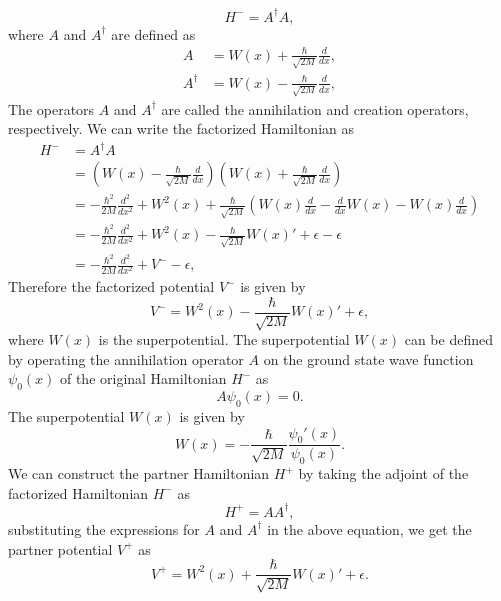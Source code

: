 \documentclass[a4paper, 12pt]{article}
\begin{document}
\begin{equation}
H^- = A^\dagger A,
\end{equation}
where \( A \) and \( A^\dagger \) are defined as
\begin{align}
A &= W(x)+\frac{\hbar}{\sqrt{2M}}\frac{d}{dx},\nonumber\\
A^\dagger &=W(x)-\frac{\hbar}{\sqrt{2M}}\frac{d}{dx},
\end{align}
The operators \( A \) and \( A^\dagger \) are called the annihilation and creation operators, respectively. We can write the factorized Hamiltonian as
\begin{align*}
H^- &= A^\dagger A\\
&= \left(W(x)-\frac{\hbar}{\sqrt{2M}}\frac{d}{dx}\right)\left(W(x)+\frac{\hbar}{\sqrt{2M}}\frac{d}{dx}\right)\\
&=-\frac{\hbar^2}{2M}\frac{d^2}{dx^2}+ W^2(x) + \frac{\hbar}{\sqrt{2M}}\left(W(x)\frac{d}{dx}-\frac{d}{dx}W(x)-W(x)\frac{d}{dx}\right) \\
&=-\frac{\hbar^2}{2M}\frac{d^2}{dx^2}+ W^2(x) - \frac{\hbar}{\sqrt{2M}}W(x)'+\epsilon-\epsilon \\
&=-\frac{\hbar^2}{2M}\frac{d^2}{dx^2} + V^- -\epsilon,
\end{align*}
Therefore the factorized potential \( V^- \) is given by
\begin{equation}
V^- = W^2(x) - \frac{\hbar}{\sqrt{2M}}W(x)'+\epsilon,
\end{equation}
where \( W(x) \) is the superpotential. The superpotential \( W(x) \) can be defined by operating the annihilation operator \( A \) on the ground state wave function \( \psi_0(x) \) of the original Hamiltonian \( H^- \) as
\begin{equation}
A\psi_0(x) = 0.
\end{equation}
The superpotential \( W(x) \) is given by
\begin{equation}
W(x) = -\frac{\hbar}{\sqrt{2M}}\frac{\psi_0'(x)}{\psi_0(x)}.
\end{equation}
We can construct the partner Hamiltonian \( H^+ \) by taking the adjoint of the factorized Hamiltonian \( H^- \) as
\begin{equation}
H^+ = A A^\dagger,
\end{equation}
substituting the expressions for \( A \) and \( A^\dagger \) in the above equation, we get the partner potential \( V^+ \) as
\begin{equation}
V^+ = W^2(x) + \frac{\hbar}{\sqrt{2M}}W(x)'+\epsilon.
\end{equation}
\end{document}
